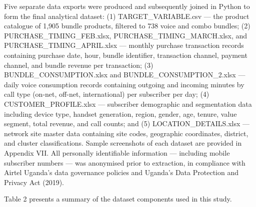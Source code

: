Five separate data exports were produced and subsequently joined in Python to form the final analytical dataset: (1) TARGET\_VARIABLE.csv --- the product catalogue of 1,905 bundle products, filtered to 738 voice and combo bundles; (2) PURCHASE\_TIMING\_FEB.xlsx, PURCHASE\_TIMING\_MARCH.xlsx, and PURCHASE\_TIMING\_APRIL.xlsx --- monthly purchase transaction records containing purchase date, hour, bundle identifier, transaction channel, payment channel, and bundle revenue per transaction; (3) BUNDLE\_CONSUMPTION.xlsx and BUNDLE\_CONSUMPTION\_2.xlsx --- daily voice consumption records containing outgoing and incoming minutes by call type (on-net, off-net, international) per subscriber per day; (4) CUSTOMER\_PROFILE.xlsx --- subscriber demographic and segmentation data including device type, handset generation, region, gender, age, tenure, value segment, total revenue, and call counts; and (5) LOCATION\_DETAILS.xlsx --- network site master data containing site codes, geographic coordinates, district, and cluster classifications. Sample screenshots of each dataset are provided in Appendix VII. All personally identifiable information --- including mobile subscriber numbers --- was anonymised prior to extraction, in compliance with Airtel Uganda's data governance policies and Uganda's Data Protection and Privacy Act (2019).

Table 2 presents a summary of the dataset components used in this study.

